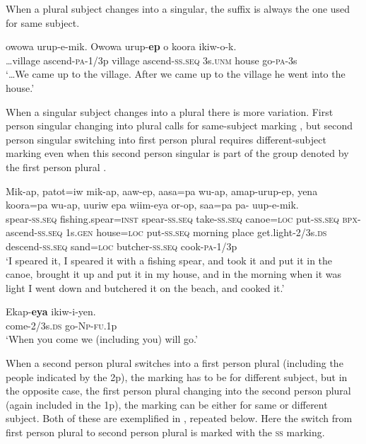 When a plural subject changes into a singular, the suffix is always the one used for same subject. 

\ea%
\label{ex:8:x1438}
\gll {\dots}owowa  urup-e-mik.  Owowa  urup-\textbf{ep } o  koora ikiw-o-k.\\
{\dots}village  ascend-\textsc{pa}-1/3p  village  ascend-\textsc{ss}.\textsc{seq} 3s.\textsc{unm} house go-\textsc{pa}-3s\\
\glt`{\dots}We came up to the village. After we came up to the village he went into the house.'
\z


When a singular subject changes into a plural there is more variation. First person singular changing into plural calls for same-subject marking , but second person singular switching into first person plural requires different-subject marking even when this second person singular is part of the group denoted by the first person plural . 

\ea%
\label{ex:8:x1435}
\gll Mik-ap,  patot=iw  mik-ap,  aaw-ep, aasa=pa  wu-ap,  amap-urup-ep,  yena  koora=pa wu-ap,  uuriw  epa  wiim-eya  or-op, saa=pa  pa-  uup-e-mik.\\
spear-\textsc{ss}.\textsc{seq} fishing.spear=\textsc{inst} spear-\textsc{ss}.\textsc{seq} take-\textsc{ss}.\textsc{seq} canoe=\textsc{loc} put-\textsc{ss}.\textsc{seq} \textsc{\textsc{bp}x}-ascend-\textsc{ss}.\textsc{seq} 1s.\textsc{gen} house=\textsc{loc} put-\textsc{ss}.\textsc{seq} morning place get.light-2/3s.\textsc{ds} descend-\textsc{ss}.\textsc{seq} sand=\textsc{loc} butcher-\textsc{ss}.\textsc{seq} cook-\textsc{pa}-1/3p\\
\glt`I speared it, I speared it with a fishing spear, and took it and put it in the canoe, brought it up and put it in my house, and in the morning when it was light I went down and butchered it on the beach, and  cooked it.'
\z


\ea%
\label{ex:8:x1439}
\gll Ekap-\textbf{eya} ikiw-i-yen.\\
come-2/3s.\textsc{ds} go-\textsc{Np}-\textsc{fu}.1p\\
\glt`When you come we (including you) will go.'
\z


When a second person plural switches into a first person plural (including the people indicated by the 2p), the marking has to be for different subject, but in the opposite case, the first person plural changing into the second person plural (again included in the 1p), the marking can be either for same or different subject. Both of these are exemplified in , repeated below. Here the switch from first person plural to second person plural is marked with the \textsc{ss} marking.


